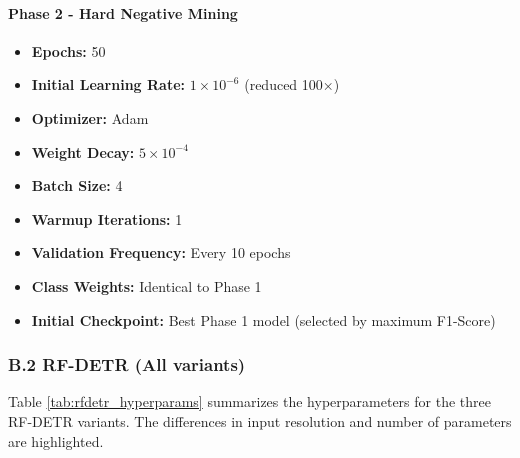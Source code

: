 \paragraph{Phase 2 - Hard Negative Mining}
\begin{itemize}
    \item \textbf{Epochs:} 50
    \item \textbf{Initial Learning Rate:} $1 \times 10^{-6}$ (reduced 100×)
    \item \textbf{Optimizer:} Adam
    \item \textbf{Weight Decay:} $5 \times 10^{-4}$
    \item \textbf{Batch Size:} 4
    \item \textbf{Warmup Iterations:} 1
    \item \textbf{Validation Frequency:} Every 10 epochs
    \item \textbf{Class Weights:} Identical to Phase 1
    \item \textbf{Initial Checkpoint:} Best Phase 1 model (selected by maximum F1-Score)
\end{itemize}

\subsubsection*{B.2 RF-DETR (All variants)}

Table \ref{tab:rfdetr_hyperparams} summarizes the hyperparameters for the three RF-DETR variants. The differences in input resolution and number of parameters are highlighted.

